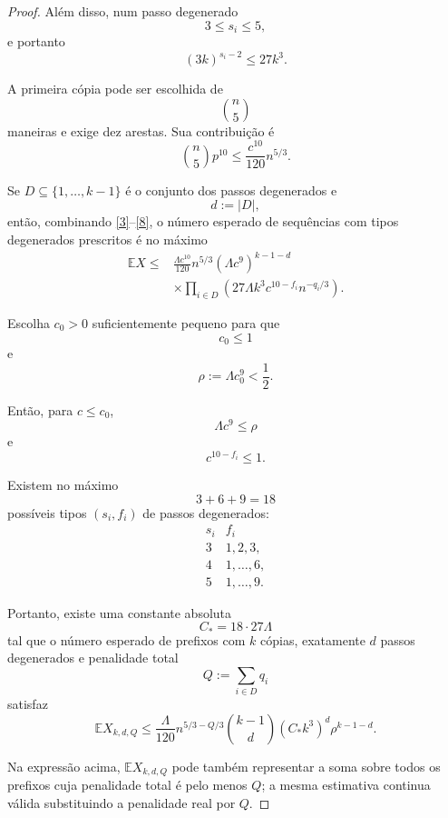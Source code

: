 \documentclass[reqno, 12pt]{amsart}
\numberwithin{equation}{section}
\theoremstyle{plain}
\theoremstyle{definition}
\begin{document}
\begin{proof}
  Além disso, num passo degenerado
  \[
    3\le s_i\le5,
  \]
  e portanto
  \[
    (3k)^{s_i-2}
    \le
    27k^3.
    \tag{7}\label{7}
  \]

  A primeira cópia pode ser escolhida de
  \[
    \binom n5
  \]
  maneiras e exige dez arestas. Sua contribuição é
  \[
    \binom n5p^{10}
    \le
    \frac{c^{10}}{120}n^{5/3}.
    \tag{8}\label{8}
  \]

  Se $D\subseteq\{1,\ldots,k-1\}$ é o conjunto dos passos
  degenerados e
  \[
    d:=|D|,
  \]
  então, combinando \eqref{3}--\eqref{8}, o número esperado de
  sequências com tipos degenerados prescritos é no máximo
  \[
    \begin{aligned}
      \mathbb E X
      \le{} &
      \frac{\Lambda c^{10}}{120}
      n^{5/3}
      (\Lambda c^9)^{k-1-d} \\
            & \times
      \prod_{i\in D}
      \left(
      27\Lambda k^3
      c^{10-f_i}
      n^{-q_i/3}
      \right).
    \end{aligned}
    \tag{9}\label{9}
  \]

  Escolha $c_0>0$ suficientemente pequeno para que
  \[
    c_0\le1
  \]
  e
  \[
    \rho:=
    \Lambda c_0^9
    <
    \frac12.
    \tag{10}\label{10}
  \]

  Então, para $c\le c_0$,
  \[
    \Lambda c^9\le\rho
  \]
  e
  \[
    c^{10-f_i}\le1.
  \]

  Existem no máximo
  \[
    3+6+9=18
  \]
  possíveis tipos $(s_i,f_i)$ de passos degenerados:
  \[
    \begin{array}{c|c}
      s_i & f_i         \\
      \hline
      3   & 1,2,3,      \\
      4   & 1,\ldots,6, \\
      5   & 1,\ldots,9.
    \end{array}
  \]

  Portanto, existe uma constante absoluta
  \[
    C_*=18\cdot27\Lambda
  \]
  tal que o número esperado de prefixos com $k$ cópias, exatamente
  $d$ passos degenerados e penalidade total
  \[
    Q:=\sum_{i\in D}q_i
  \]
  satisfaz
  \[
    \boxed{
      \mathbb E X_{k,d,Q}
      \le
      \frac{\Lambda}{120}
      n^{5/3-Q/3}
      \binom{k-1}{d}
      (C_*k^3)^d
      \rho^{k-1-d}.
    }
    \tag{11}\label{11}
  \]

  Na expressão acima, $\mathbb E X_{k,d,Q}$ pode também representar a
  soma sobre todos os prefixos cuja penalidade total é pelo menos $Q$;
  a mesma estimativa continua válida substituindo a penalidade real por
  $Q$.


\end{proof}
\end{document}
